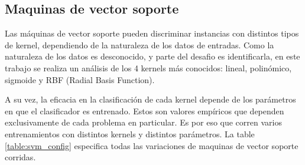 \documentclass[journal]{IEEEtran}
\begin{document}
\subsection{Maquinas de vector soporte}
Las máquinas de vector soporte pueden discriminar instancias con distintos
tipos de kernel, dependiendo de la naturaleza de los datos de entradas. Como
la naturaleza de los datos es desconocido, y parte del desafio es identificarla,
en este trabajo se realiza un análisis de los 4 kernels más conocidos: lineal,
polinómico, sigmoide y RBF (Radial Basis Function).

A su vez, la eficacia en la clasificación de cada kernel depende de los
parámetros en que el clasificador es entrenado. Estos son valores empíricos
que dependen exclusivamente de cada problema en particular. Es por eso
que corren varios entrenamientos con distintos kernels y distintos parámetros.
La table \ref{table:svm_config} especifica todas las variaciones de maquinas 
de vector soporte corridas.
\end{document}
